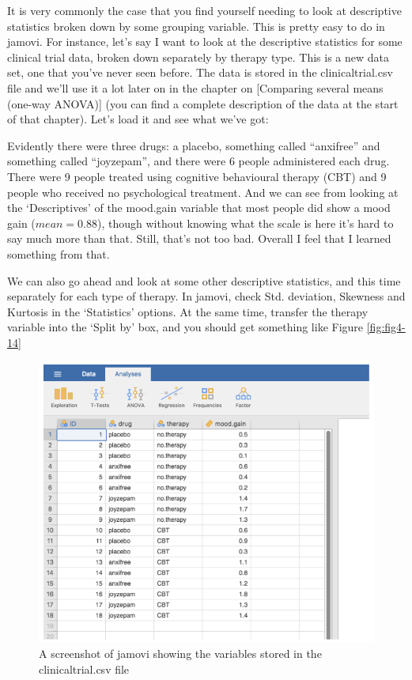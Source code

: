 \documentclass[
]{book}
\begin{document}
It is very commonly the case that you find yourself needing to look at descriptive statistics broken down by some grouping variable. This is pretty easy to do in jamovi. For instance, let's say I want to look at the descriptive statistics for some clinical trial data, broken down separately by therapy type. This is a new data set, one that you've never seen before. The data is stored in the clinicaltrial.csv file and we'll use it a lot later on in the chapter on {[}Comparing several means (one-way ANOVA){]} (you can find a complete description of the data at the start of that chapter). Let's load it and see what we've got:

Evidently there were three drugs: a placebo, something called ``anxifree'' and something called ``joyzepam'', and there were 6 people administered each drug. There were 9 people treated using cognitive behavioural therapy (CBT) and 9 people who received no psychological treatment. And we can see from looking at the `Descriptives' of the mood.gain variable that most people did show a mood gain (\(mean = 0.88\)), though without knowing what the scale is here it's hard to say much more than that. Still, that's not too bad. Overall I feel that I learned something from that.

We can also go ahead and look at some other descriptive statistics, and this time separately for each type of therapy. In jamovi, check Std. deviation, Skewness and Kurtosis in the `Statistics' options. At the same time, transfer the therapy variable into the `Split by' box, and you should get something like Figure \ref{fig:fig4-14}

\begin{figure}
\includegraphics[width=0.9\linewidth]{images/Figure20} \caption{A screenshot of jamovi showing the variables stored in the clinicaltrial.csv file}\label{fig:fig4-13}
\end{figure}
\end{document}
